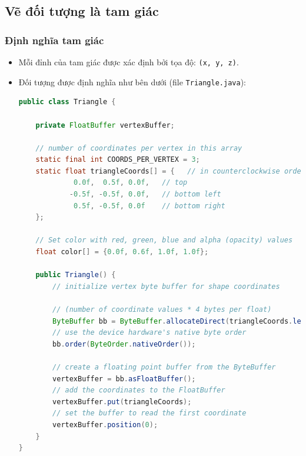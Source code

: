 \documentclass[13pt,a4paper]{extreport}
\begin{document}
\subsection{Vẽ đối tượng là tam giác}
\subsubsection{Định nghĩa tam giác}
	\begin{itemize}
		\item Mỗi đỉnh của tam giác được xác định bởi tọa độ: \verb|(x, y, z)|.
		\item Đối tượng được định nghĩa như bên dưới (file \verb|Triangle.java|):
			\begin{lstlisting}[language=Java]
public class Triangle {

    private FloatBuffer vertexBuffer;

    // number of coordinates per vertex in this array
    static final int COORDS_PER_VERTEX = 3;
    static float triangleCoords[] = {   // in counterclockwise order:
             0.0f,  0.5f, 0.0f,   // top
            -0.5f, -0.5f, 0.0f,   // bottom left
             0.5f, -0.5f, 0.0f    // bottom right
    };

    // Set color with red, green, blue and alpha (opacity) values
    float color[] = {0.0f, 0.6f, 1.0f, 1.0f};

    public Triangle() {
        // initialize vertex byte buffer for shape coordinates
        
        // (number of coordinate values * 4 bytes per float)
        ByteBuffer bb = ByteBuffer.allocateDirect(triangleCoords.length*4);
        // use the device hardware's native byte order
        bb.order(ByteOrder.nativeOrder());

        // create a floating point buffer from the ByteBuffer
        vertexBuffer = bb.asFloatBuffer();
        // add the coordinates to the FloatBuffer
        vertexBuffer.put(triangleCoords);
        // set the buffer to read the first coordinate
        vertexBuffer.position(0);
    }
}
			\end{lstlisting}
	\end{itemize}
	
\end{document}
